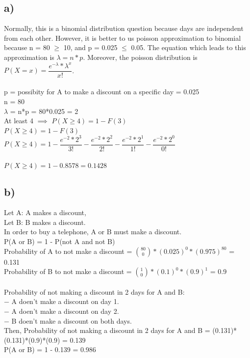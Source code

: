 \documentclass[12pt]{article}
\begin{document}
\subsection*{a)} 
Normally, this is a binomial distribution question because days are independent from each other. However, it is better to us poisson approximation to binomial because n = 80 $\geq$ 10, and p = 0.025 $\leq$ 0.05. The equation which leads to this approximation is $\lambda = n*p$. Moreover, the poisson distribution is $P(X=x) = \dfrac{e^{-\lambda}*\lambda^{x}}{x!}$.\\
\\
p = possibity for A to make a discount on a specific day = 0.025\\
n = 80\\
$\lambda$ = n*p = 80*0.025 = 2\\
At least 4 $\implies$ $P(X \geq 4) = 1 - F(3)$\\
$P(X \geq 4) = 1 - F(3)$\\
$P(X \geq 4) = 1 - \dfrac{e^{-2}*2^{3}}{3!} - \dfrac{e^{-2}*2^{2}}{2!} - \dfrac{e^{-2}*2^{1}}{1!} -\dfrac{e^{-2}*2^{0}}{0!}$\\
\\

$P(X \geq 4) = 1 - 0.8578 = 0.1428$\\



\subsection*{b)} 
Let A: A makes a discount,\\
Let B: B makes a discount.\\
In order to buy a telephone, A or B must make a discount.\\
P(A or B) = 1 - P(not A and not B)\\
Probability of A to not make a discount = $\binom{80}{0}*(0.025)^0*(0.975)^80$ = 0.131\\
Probability of B to not make a discount = $\binom{1}{0}*(0.1)^0*(0.9)^1$ = 0.9\\
\\
Probability of not making a discount in 2 days for A and B:\\
$-$ A doen't make a discount on day 1.\\
$-$ A doen't make a discount on day 2.\\
$-$ B doen't make a discount on both days.\\
Then, Probability of not making a discount in 2 days for A and B = (0.131)*(0.131)*(0.9)*(0.9) = 0.139\\
P(A or B) = 1 - 0.139 = 0.986\\
\end{document}
